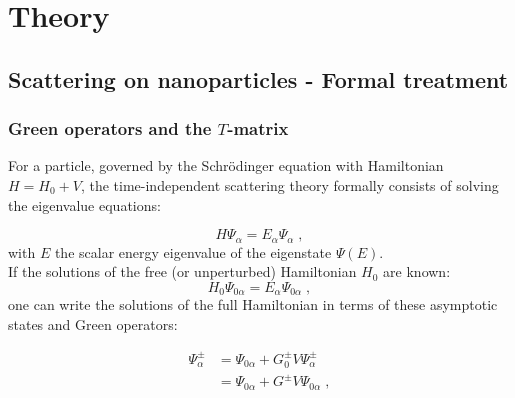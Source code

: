 


\chapter{Theory} \label{app:theory}


\section{Scattering on nanoparticles - Formal treatment} \label{sec:formal}

\subsection{Green operators and the $T$-matrix}

For a particle, governed by the Schr\"odinger equation with Hamiltonian $H = H_0 + V$, the time-independent scattering theory formally consists of solving the eigenvalue equations:

\begin{equation*}
  H\Psi_\alpha = E_\alpha\Psi_\alpha \; ,
\end{equation*}
with $E$ the scalar energy eigenvalue of the eigenstate $\Psi(E)$.\\
If the solutions of the free (or unperturbed) Hamiltonian $H_0$ are known:
\begin{equation*}
  H_0\Psi_{0\alpha} = E_\alpha\Psi_{0\alpha} \; ,
\end{equation*}
one can write the solutions of the full Hamiltonian in terms of these asymptotic states and Green operators:

\begin{align*}
  \Psi^\pm_\alpha &= \Psi_{0\alpha} + G^\pm_0 V \Psi^\pm_\alpha  \\
  & = \Psi_{0\alpha} + G^\pm V  \Psi_{0\alpha} \; ,
\end{align*}

